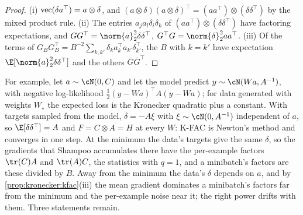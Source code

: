 \begin{refsection}
\begin{proof}
(i) $\operatorname{vec}(\delta a^\top)=a\otimes\delta$, and $(a\otimes\delta)(a\otimes\delta)^\top=(aa^\top)\otimes(\delta\delta^\top)$ by the mixed product rule. (ii) The entries $a_ja_l\delta_i\delta_k$ of $(aa^\top)\otimes(\delta\delta^\top)$ have factoring expectations, and $GG^\top=\norm{a}_2^2\delta\delta^\top$, $G^\top G=\norm{\delta}_2^2aa^\top$. (iii) Of the terms of $G_BG_B^\top=B^{-2}\sum_{k,k'}\delta_ka_k^\top a_{k'}\delta_{k'}^\top$, the $B$ with $k=k'$ have expectation $\E[\norm{a}_2^2\delta\delta^\top]$ and the others $\bar G\bar G^\top$.
\end{proof}

For example, let $a\sim\cN(0,C)$ and let the model predict $y\sim\cN(Wa,A^{-1})$, with negative log-likelihood $\frac12(y-Wa)^\top A(y-Wa)$; for data generated with weights $W_\star$ the expected loss is the Kronecker quadratic plus a constant. With targets sampled from the model, $\delta=-A\xi$ with $\xi\sim\cN(0,A^{-1})$ independent of $a$, so $\E[\delta\delta^\top]=A$ and $F=C\otimes A=H$ at every $W$: K-FAC is Newton's method and converges in one step. At the minimum the data's targets give the same $\delta$, so the gradients that Shampoo accumulates there have the per-example factors $\tr(C)A$ and $\tr(A)C$, the statistics with $q=1$, and a minibatch's factors are these divided by $B$. Away from the minimum the data's $\delta$ depends on $a$, and by \cref{prop:kronecker:kfac}(iii) the mean gradient dominates a minibatch's factors far from the minimum and the per-example noise near it; the right power drifts with them. Three statements remain.



\end{refsection}
